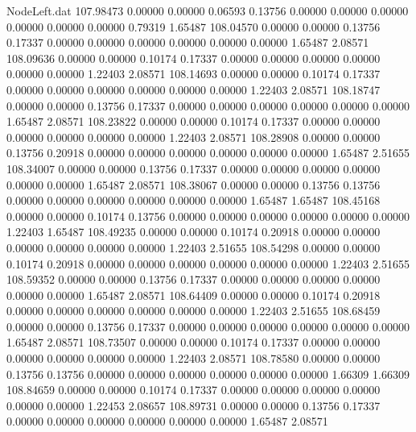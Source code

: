 \begin{filecontents}{NodeLeft.dat}
 107.98473    0.00000    0.00000     0.06593    0.13756    0.00000    0.00000    0.00000    0.00000    0.00000    0.00000    0.79319    1.65487
 108.04570    0.00000    0.00000     0.13756    0.17337    0.00000    0.00000    0.00000    0.00000    0.00000    0.00000    1.65487    2.08571
 108.09636    0.00000    0.00000     0.10174    0.17337    0.00000    0.00000    0.00000    0.00000    0.00000    0.00000    1.22403    2.08571
 108.14693    0.00000    0.00000     0.10174    0.17337    0.00000    0.00000    0.00000    0.00000    0.00000    0.00000    1.22403    2.08571
 108.18747    0.00000    0.00000     0.13756    0.17337    0.00000    0.00000    0.00000    0.00000    0.00000    0.00000    1.65487    2.08571
 108.23822    0.00000    0.00000     0.10174    0.17337    0.00000    0.00000    0.00000    0.00000    0.00000    0.00000    1.22403    2.08571
 108.28908    0.00000    0.00000     0.13756    0.20918    0.00000    0.00000    0.00000    0.00000    0.00000    0.00000    1.65487    2.51655
 108.34007    0.00000    0.00000     0.13756    0.17337    0.00000    0.00000    0.00000    0.00000    0.00000    0.00000    1.65487    2.08571
 108.38067    0.00000    0.00000     0.13756    0.13756    0.00000    0.00000    0.00000    0.00000    0.00000    0.00000    1.65487    1.65487
 108.45168    0.00000    0.00000     0.10174    0.13756    0.00000    0.00000    0.00000    0.00000    0.00000    0.00000    1.22403    1.65487
 108.49235    0.00000    0.00000     0.10174    0.20918    0.00000    0.00000    0.00000    0.00000    0.00000    0.00000    1.22403    2.51655
 108.54298    0.00000    0.00000     0.10174    0.20918    0.00000    0.00000    0.00000    0.00000    0.00000    0.00000    1.22403    2.51655
 108.59352    0.00000    0.00000     0.13756    0.17337    0.00000    0.00000    0.00000    0.00000    0.00000    0.00000    1.65487    2.08571
 108.64409    0.00000    0.00000     0.10174    0.20918    0.00000    0.00000    0.00000    0.00000    0.00000    0.00000    1.22403    2.51655
 108.68459    0.00000    0.00000     0.13756    0.17337    0.00000    0.00000    0.00000    0.00000    0.00000    0.00000    1.65487    2.08571
 108.73507    0.00000    0.00000     0.10174    0.17337    0.00000    0.00000    0.00000    0.00000    0.00000    0.00000    1.22403    2.08571
 108.78580    0.00000    0.00000     0.13756    0.13756    0.00000    0.00000    0.00000    0.00000    0.00000    0.00000    1.66309    1.66309
 108.84659    0.00000    0.00000     0.10174    0.17337    0.00000    0.00000    0.00000    0.00000    0.00000    0.00000    1.22453    2.08657
 108.89731    0.00000    0.00000     0.13756    0.17337    0.00000    0.00000    0.00000    0.00000    0.00000    0.00000    1.65487    2.08571

\end{filecontents}
